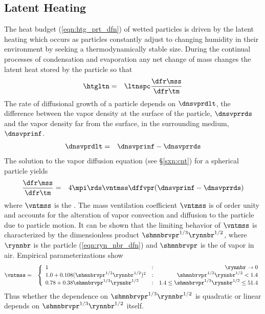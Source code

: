 \documentclass[12pt,twoside]{book}
\begin{document}
\subsection{Latent Heating}\label{sxn:ltn_htg}
The heat budget (\ref{eqn:htg_prt_dfn}) of wetted particles is driven
by the latent heating which occurs as particles constantly adjust to
changing humidity in their environment by seeking a thermodynamically
stable size.
During the continual processes of condensation and evaporation any net
change of mass changes the latent heat stored by the particle so that
\begin{eqnarray}
\htgltn & = & \ltnspc \frac{\dfr\mss}{\dfr\tm}
\label{eqn:htg_ltn_dfn1}
\end{eqnarray}
The rate of diffusional growth of a particle depends on $\dnsvprdlt$,
the difference between the vapor density at the surface of the
particle, $\dnsvprrds$ and the vapor density far from the surface, in
the surrounding medium, $\dnsvprinf$. 
\begin{eqnarray}
\dnsvprdlt & = & \dnsvprinf - \dnsvprrds
\label{eqn:dns_vpr_dlt_dfn}
\end{eqnarray}
The solution to the vapor diffusion equation (see \S\ref{sxn:cnt}) for
a spherical particle yields 
\begin{eqnarray}
\frac{\dfr\mss}{\dfr\tm} & = & 4 \mpi \rds \vntmss \dffvpr 
( \dnsvprinf - \dnsvprrds ) 
\label{eqn:mss_dff_sln}
\end{eqnarray}
where $\vntmss$ is the .
The mass ventilation coefficient $\vntmss$ is of order unity and
accounts for the alteration of vapor convection and diffusion to the
particle due to particle motion.
It can be shown that the limiting behavior of $\vntmss$ is
characterized by the dimensionless product 
$\shmnbrvpr^{1/3} \rynnbr^{1/2}$, 
where $\rynnbr$ is the particle 
(\ref{eqn:ryn_nbr_dfn}) and $\shmnbrvpr$ is the  of vapor in air. 
Empirical parameterizations \cite[see][p.~541]{PrK98} show
\begin{eqnarray}
\vntmss & = & \left\{
\begin{array}{l@{\quad:\quad}r}
1
& \rynnbr \rightarrow 0 \\
1.0 + 0.108 (\shmnbrvpr^{1/3} \rynnbr^{1/2})^{2} 
& \shmnbrvpr^{1/3} \rynnbr^{1/2} < 1.4 \\
0.78 + 0.38 \shmnbrvpr^{1/3} \rynnbr^{1/2}
& 1.4 \le \shmnbrvpr^{1/3} \rynnbr^{1/2} \le 51.4
\end{array} \right.
\label{eqn:vnt_mss_dfn}
\end{eqnarray}
Thus whether the dependence on $\shmnbrvpr^{1/3} \rynnbr^{1/2}$ is
quadratic or linear depends on $\shmnbrvpr^{1/3} \rynnbr^{1/2}$
itself. 
\end{document}

